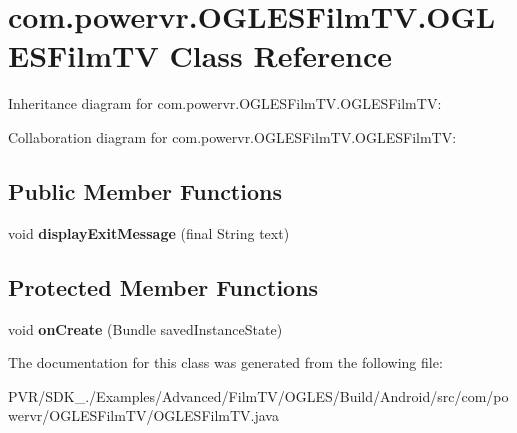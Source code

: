 \hypertarget{classcom_1_1powervr_1_1_o_g_l_e_s_film_t_v_1_1_o_g_l_e_s_film_t_v}{\section{com.\+powervr.\+O\+G\+L\+E\+S\+Film\+T\+V.\+O\+G\+L\+E\+S\+Film\+T\+V Class Reference}
\label{classcom_1_1powervr_1_1_o_g_l_e_s_film_t_v_1_1_o_g_l_e_s_film_t_v}
}


Inheritance diagram for com.\+powervr.\+O\+G\+L\+E\+S\+Film\+T\+V.\+O\+G\+L\+E\+S\+Film\+T\+V\+:


Collaboration diagram for com.\+powervr.\+O\+G\+L\+E\+S\+Film\+T\+V.\+O\+G\+L\+E\+S\+Film\+T\+V\+:
\subsection*{Public Member Functions}
\begin{DoxyCompactItemize}
\item 
\hypertarget{classcom_1_1powervr_1_1_o_g_l_e_s_film_t_v_1_1_o_g_l_e_s_film_t_v_ae639a2d4147c57c99213b4ab91c43ef1}{void {\bfseries display\+Exit\+Message} (final String text)}\label{classcom_1_1powervr_1_1_o_g_l_e_s_film_t_v_1_1_o_g_l_e_s_film_t_v_ae639a2d4147c57c99213b4ab91c43ef1}

\end{DoxyCompactItemize}
\subsection*{Protected Member Functions}
\begin{DoxyCompactItemize}
\item 
\hypertarget{classcom_1_1powervr_1_1_o_g_l_e_s_film_t_v_1_1_o_g_l_e_s_film_t_v_ad7f620e518cc669ac9dfe02922fc28a3}{void {\bfseries on\+Create} (Bundle saved\+Instance\+State)}\label{classcom_1_1powervr_1_1_o_g_l_e_s_film_t_v_1_1_o_g_l_e_s_film_t_v_ad7f620e518cc669ac9dfe02922fc28a3}

\end{DoxyCompactItemize}


The documentation for this class was generated from the following file\+:\begin{DoxyCompactItemize}
\item 
P\+V\+R/\+S\+D\+K\+\_./\+Examples/\+Advanced/\+Film\+T\+V/\+O\+G\+L\+E\+S/\+Build/\+Android/src/com/powervr/\+O\+G\+L\+E\+S\+Film\+T\+V/O\+G\+L\+E\+S\+Film\+T\+V.\+java\end{DoxyCompactItemize}

